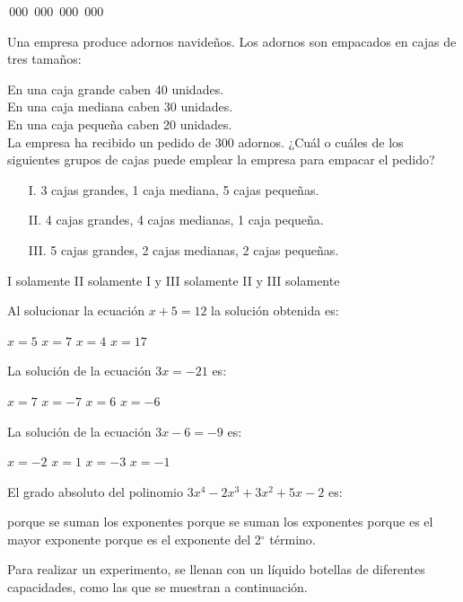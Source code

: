 \documentclass[10pt,letterpaper,addpoints]{exam}
\begin{document}
\begin{questions}
\begin{oneparchoices}
\,000
\,000
\,000
\,000
\end{oneparchoices}
\question Una empresa produce adornos navideños. Los adornos son empacados en cajas de tres tamaños:

En una caja grande caben 40 unidades.\\
En una caja mediana caben 30 unidades.\\
En una caja pequeña caben 20 unidades.  \\

La empresa ha recibido un pedido de 300 adornos. ¿Cuál o cuáles de los siguientes grupos de cajas puede emplear la empresa para empacar el pedido?
\begin{itemize}
\item[I.] 3 cajas grandes, 1 caja mediana, 5 cajas pequeñas.
\item[II.] 4 cajas grandes, 4 cajas medianas, 1 caja pequeña.
\item[III.] 5 cajas grandes, 2 cajas medianas, 2 cajas pequeñas.
\end{itemize}

\begin{oneparchoices}
\choice I solamente
\choice II solamente
\choice I y III solamente
\CorrectChoice II y III solamente
\end{oneparchoices}
\question Al solucionar la ecuación $x+5=12$ la solución obtenida es:

\begin{oneparchoices}
\choice $x=5$
\CorrectChoice $x=7$
\choice $x=4$
\choice $x=17$
\end{oneparchoices}
\question La solución de la ecuación $3x=-21$ es:

\begin{oneparchoices}
\choice $x=7$
\CorrectChoice $x=-7$
\choice $x=6$
\choice $x=-6$
\end{oneparchoices}
\question La solución de la ecuación $3x-6=-9$ es:

\begin{oneparchoices}
\choice $x=-2$
\choice $x=1$
\choice $x=-3$
\CorrectChoice $x=-1$
\end{oneparchoices}
\question El grado absoluto del polinomio $3x^{4}-2x^{3}+3x^{2}+5x-2$ es:

\begin{choices}
 porque se suman los exponentes
 porque se suman los exponentes
 porque es el mayor exponente
 porque es el exponente del 2$^{\circ}$ término.
\end{choices}
\begin{minipage}{.5\textwidth}
\question Para realizar un experimento, se llenan con un líquido botellas de diferentes capacidades, como las que se muestran a continuación.\\


\end{minipage}
\end{questions}
\end{document}
